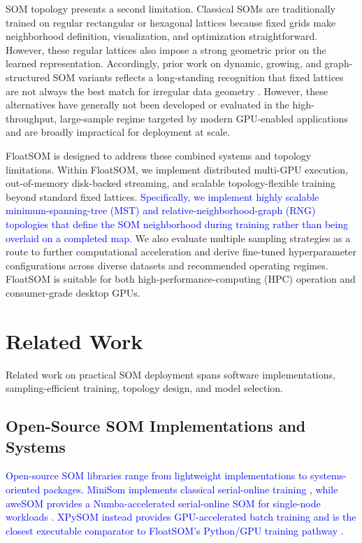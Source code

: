 \documentclass[10pt]{article} %
\newcommand{\TrackedChange}[1]{\textcolor{blue}{#1}}
\begin{document}
SOM topology presents a second limitation. Classical SOMs are traditionally trained on regular rectangular or hexagonal lattices because fixed grids make neighborhood definition, visualization, and optimization straightforward. However, these regular lattices also impose a strong geometric prior on the learned representation. Accordingly, prior work on dynamic, growing, and graph-structured SOM variants reflects a long-standing recognition that fixed lattices are not always the best match for irregular data geometry \citep{alahakoonDynamicSelforganizingMaps2000,vasighiDirectedBatchGrowing2017,kangasVariantsSelforganizingMaps1990}. However, these alternatives have generally not been developed or evaluated in the high-throughput, large-sample regime targeted by modern GPU-enabled applications and are broadly impractical for deployment at scale.

FloatSOM is designed to address these combined systems and topology limitations. Within FloatSOM, we implement distributed multi-GPU execution, out-of-memory disk-backed streaming, and scalable topology-flexible training beyond standard fixed lattices. \TrackedChange{Specifically, we implement highly scalable minimum-spanning-tree (MST) and relative-neighborhood-graph (RNG) topologies that define the SOM neighborhood during training rather than being overlaid on a completed map.} We also evaluate multiple sampling strategies as a route to further computational acceleration and derive fine-tuned hyperparameter configurations across diverse datasets and recommended operating regimes. FloatSOM is suitable for both high-performance-computing (HPC) operation and consumer-grade desktop GPUs.

\section{Related Work}

Related work on practical SOM deployment spans software implementations, sampling-efficient training, topology design, and model selection.

\subsection{Open-Source SOM Implementations and Systems}

\TrackedChange{Open-source SOM libraries range from lightweight implementations to systems-oriented packages.} \TrackedChange{MiniSom implements classical serial-online training \citep{vettigliJustGlowingMinisom2018}, while aweSOM provides a Numba-accelerated serial-online SOM for single-node workloads \citep{haAweSOMCPUGPUaccelerated2025}.} \TrackedChange{XPySOM instead provides GPU-accelerated batch training and is the closest executable comparator to FloatSOM's Python/GPU training pathway \citep{manciniXPySomHighPerformanceSelfOrganizing2020}.}
\end{document}
